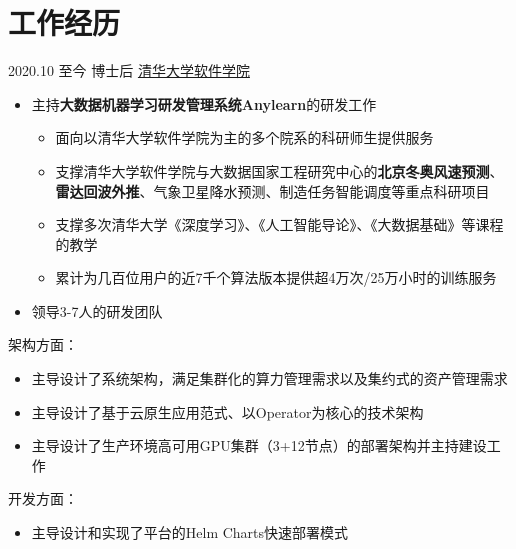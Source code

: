 \documentclass[letterpaper]{twentysecondcv} %
\begin{document}
\vspace{-0.6cm}
\section{工作经历}

\begin{twentyfluid}

\twentyitemfluid
    {2020.10 至今}
    {博士后}
    {\href{https://www.thss.tsinghua.edu.cn/index.htm}{清华大学软件学院}}
    {\\     }
    {
    {
    \vspace{-0.2cm}
    \begin{itemize}
        \item 主持\textbf{大数据机器学习研发管理系统Anylearn}的研发工作
        \begin{itemize}
            \item 面向以清华大学软件学院为主的多个院系的科研师生提供服务
            \item 支撑清华大学软件学院与大数据国家工程研究中心的\textbf{北京冬奥风速预测}、\textbf{雷达回波外推}、气象卫星降水预测、制造任务智能调度等重点科研项目
            \item 支撑多次清华大学《深度学习》、《人工智能导论》、《大数据基础》等课程的教学
            \item 累计为几百位用户的近7千个算法版本提供超4万次/25万小时的训练服务
        \end{itemize}
        \item 领导3-7人的研发团队
    \end{itemize}
    架构方面：
    \vspace{-0.1cm}
    \begin{itemize}
        \item 主导设计了系统架构，满足集群化的算力管理需求以及集约式的资产管理需求
        \item 主导设计了基于云原生应用范式、以Operator为核心的技术架构
        \item 主导设计了生产环境高可用GPU集群（3+12节点）的部署架构并主持建设工作
    \end{itemize}
    开发方面：
    \vspace{-0.1cm}
    \begin{itemize}
        \item 主导设计和实现了平台的Helm Charts快速部署模式

\end{itemize}}}
\end{twentyfluid}
\end{document}
